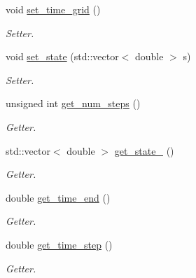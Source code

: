 \begin{DoxyCompactItemize}
\mbox{\label{classprocess_af548473ced7827cf2f100a2c74cdaf76}} 
void \mbox{\hyperlink{classprocess_af548473ced7827cf2f100a2c74cdaf76}{set\+\_\+time\+\_\+grid}} ()
\begin{DoxyCompactList}\small\item\em Setter. \end{DoxyCompactList}\item 
\mbox{\label{classprocess_a149855679fd1188aee51401c07ad35f7}} 
void \mbox{\hyperlink{classprocess_a149855679fd1188aee51401c07ad35f7}{set\+\_\+state}} (std\+::vector$<$ double $>$ s)
\begin{DoxyCompactList}\small\item\em Setter. \end{DoxyCompactList}\item 
\mbox{\label{classprocess_ac469abbf135402311103bf3ca1900748}} 
unsigned int \mbox{\hyperlink{classprocess_ac469abbf135402311103bf3ca1900748}{get\+\_\+num\+\_\+steps}} ()
\begin{DoxyCompactList}\small\item\em Getter. \end{DoxyCompactList}\item 
\mbox{\label{classprocess_aef5d6a76efc3aa712f8cd41bf9438cba}} 
std\+::vector$<$ double $>$ \mbox{\hyperlink{classprocess_aef5d6a76efc3aa712f8cd41bf9438cba}{get\+\_\+state\+\_}} ()
\begin{DoxyCompactList}\small\item\em Getter. \end{DoxyCompactList}\item 
\mbox{\label{classprocess_a047f0d44f3ec8ddd8d5edfcc09192615}} 
double \mbox{\hyperlink{classprocess_a047f0d44f3ec8ddd8d5edfcc09192615}{get\+\_\+time\+\_\+end}} ()
\begin{DoxyCompactList}\small\item\em Getter. \end{DoxyCompactList}\item 
\mbox{\label{classprocess_acef251d897e6cec1fe68d1bb59094013}} 
double \mbox{\hyperlink{classprocess_acef251d897e6cec1fe68d1bb59094013}{get\+\_\+time\+\_\+step}} ()
\begin{DoxyCompactList}\small\item\em Getter. \end{DoxyCompactList}\item 

\end{DoxyCompactItemize}
